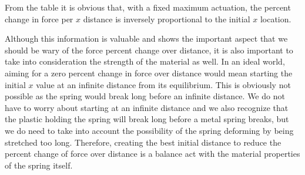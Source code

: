 \begin{table}[h!]
  \centering
  \caption{The tabularized relationship between stretch and tension in a spring}
  \label{Tab:x_force}
\end{table}

From the table it is obvious that, with a fixed maximum actuation, the percent change in force per $ x $ distance is inversely proportional to the initial $ x $ location.

Although this information is valuable and shows the important aspect that we should be wary of the force percent change over distance, it is also important to take into consideration the strength of the material as well. In an ideal world, aiming for a zero percent change in force over distance would mean starting the initial $ x $ value at an infinite distance from its equilibrium. This is obviously not possible as the spring would break long before an infinite distance. We do not have to worry about starting at an infinite distance and we also recognize that the plastic holding the spring will break long before a metal spring breaks, but we do need to take into account the possibility of the spring deforming by being stretched too long. Therefore, creating the best initial distance to reduce the percent change of force over distance is a balance act with the material properties of the spring itself.

